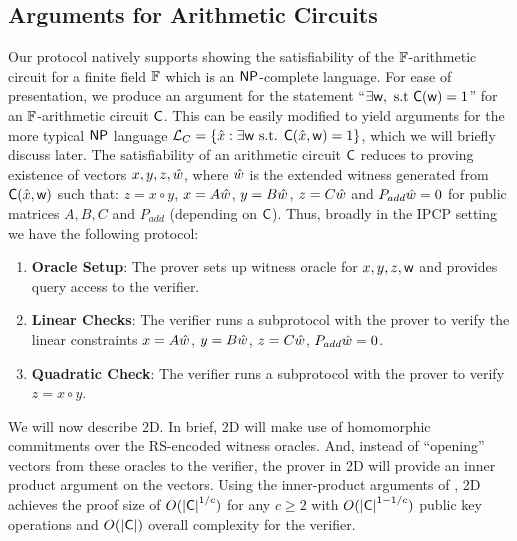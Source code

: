 \subsection{Arguments for Arithmetic Circuits}
Our protocol natively supports showing the satisfiability of the $\mathbb{F}$-arithmetic circuit for a finite field $\mathbb{F}$ which
is an $\mathsf{NP}$-complete language. For ease of presentation, we produce an argument for the statement ``$\exists \mathsf{w}, \text{ s.t } \mathsf{C}(\mathsf{w})=1$'' for an $\mathbb{F}$-arithmetic circuit $\mathsf{C}$. This can be easily modified to yield arguments for the more typical $\mathsf{NP}$ language $\mathcal{L}_C = \{\hat{x} :\exists \mathsf{w} \text{ s.t. } \mathsf{C}(\hat{x},\mathsf{w})=1\}$, which we will briefly discuss later. The satisfiability of an arithmetic circuit $\mathsf{C}$ reduces to proving existence of vectors $x,y,z,\hat{w}$, where $\hat{w}$ is the extended witness generated from $\mathsf{C}(\hat{x},\mathsf{w})$ such that:
$z = x \circ y$,
$x = A \hat{w}$,
$y = B \hat{w}$,
$z = C \hat{w}$ and
$P_{add} \hat{w} = 0$ for public matrices $A,B,C$ and $P_{add}$ (depending on $\mathsf{C}$). Thus, broadly in the IPCP setting we have the following protocol:
\begin{enumerate}
\item {\bf Oracle Setup}: The prover sets up witness oracle for $x,y,z,\mathsf{w}$ and provides query access to the verifier. 
\item {\bf Linear Checks}: The verifier runs a subprotocol with the prover to verify the linear constraints $x=A \hat{w}$, $y=B \hat{w}$, $z=C \hat{w}$, $P_{add} \hat{w} = 0$.
\item {\bf Quadratic Check}: The verifier runs a subprotocol with the prover to verify $z=x\circ y$.
\end{enumerate}


We will now describe \name2D{}. In brief, \name2D{} will make use of homomorphic commitments over the RS-encoded witness oracles.
And, instead of ``opening'' vectors from these oracles to the verifier, the prover in \name2D{} will provide an inner product argument on the vectors.
Using the inner-product arguments of \cite{InnerProductDLS, bulletproofs}, \name2D{} achieves the proof size of $O(\mathsf{|C|}^{1/c})$ for any $c \geq 2$ with $O(\mathsf{|C|}^{1-1/c})$ public key operations and $O(\mathsf{|C|})$ overall complexity for the verifier. 
